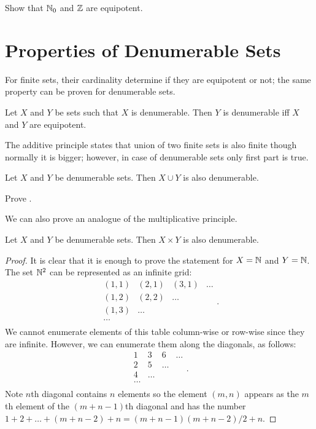 \begin{exercise}
  Show that ${\mathbb{N}}_0$ and ${\mathbb{Z}}$ are equipotent.
\end{exercise}

\section{Properties of Denumerable Sets}

For finite sets, their cardinality determine if they are equipotent or not; the
same property can be proven for denumerable sets.
\begin{remark}
\label{remark:denumerable-equipotent-to-denumerable}
  Let $X$ and $Y$ be sets such that $X$ is denumerable. Then $Y$ is denumerable
  iff $X$ and $Y$ are equipotent.
\end{remark}

The additive principle states that union of two finite sets is also finite
though normally it is bigger; however, in case of denumerable sets only first
part is true.
\begin{theorem}
\label{theorem:union-denumerable-sets}
  Let $X$ and $Y$ be denumerable sets. Then $X \cup Y$ is also denumerable.
\end{theorem}

\begin{exercise}
  Prove .
\end{exercise}


We can also prove an analogue of the multiplicative principle.
\begin{theorem}
  Let $X$ and $Y$ be denumerable sets. Then $X \times Y$ is also denumerable.
\end{theorem}
\begin{proof}
  It is clear that it is enough to prove the statement for $X = {\mathbb{N}}$ and $Y =
  {\mathbb{N}}$. The set ${\mathbb{N}}^2$ can be represented as an infinite grid:
  \[
    \begin{matrix}
      (1, 1) & (2, 1) & (3, 1) & \dots \\
      (1, 2) & (2, 2) & \dots \\
      (1, 3) & \dots \\
      \dots \\
    \end{matrix}.
  \]
  We cannot enumerate elements of this table column-wise or row-wise since they
  are infinite. However, we can enumerate them along the diagonals, as follows:
  \[
    \begin{matrix}
      1 & 3 & 6 & \dots \\
      2 & 5 & \dots \\
      4 & \dots \\
      \dots \\
    \end{matrix}.
  \]
  Note $n$th diagonal contains $n$ elements so the element $(m, n)$ appears as
  the $m$th element of the $(m + n - 1)$th diagonal and has the number 
  $1 + 2 + \dots + (m + n - 2) + n = (m + n - 1) (m + n - 2) / 2 + n$.
\end{proof}

